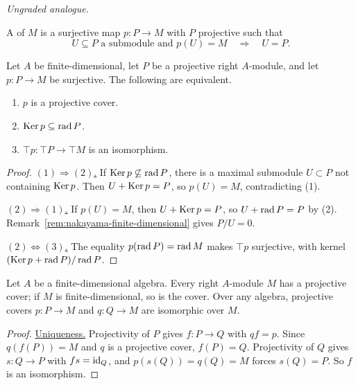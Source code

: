 \begin{advanced}
\emph{Ungraded analogue.}

\begin{definition}\label{def:projective-cover}
A  of $M$ is a surjective map $p:P\to M$ with $P$ projective such that
\[
U\subseteq P\text{ a submodule and }p(U)=M
\quad\Longrightarrow\quad U=P.
\]
\end{definition}

\begin{proposition}\label{prop:cover-top}
Let $A$ be finite-dimensional, let $P$ be a projective right $A$-module, and let $p:P\to M$ be surjective.
The following are equivalent.
\begin{enumerate}
\item $p$ is a projective cover.
\item $\operatorname{Ker}\nolimits p\subseteq \operatorname{rad}\nolimits P$.
\item $\top p:\top P\to\top M$ is an isomorphism.
\end{enumerate}
\end{proposition}

\begin{proof}
\underline{$(1)\Rightarrow(2)$.}
If $\operatorname{Ker}\nolimits p\not\subseteq\operatorname{rad}\nolimits P$, there is a maximal submodule $U\subset P$ not containing $\operatorname{Ker}\nolimits p$.
Then $U+\operatorname{Ker}\nolimits p=P$, so $p(U)=M$, contradicting (1).

\underline{$(2)\Rightarrow(1)$.}
If $p(U)=M$, then $U+\operatorname{Ker}\nolimits p=P$, so $U+\operatorname{rad}\nolimits P=P$ by (2).
Remark~\ref{rem:nakayama-finite-dimensional} gives $P/U=0$.

\underline{$(2)\Leftrightarrow(3)$.}
The equality $p(\operatorname{rad}\nolimits P)=\operatorname{rad}\nolimits M$ makes $\top p$ surjective, with kernel $(\operatorname{Ker}\nolimits p+\operatorname{rad}\nolimits P)/\operatorname{rad}\nolimits P$.
\end{proof}

\begin{theorem}\label{thm:ordinary-projective-covers}
Let $A$ be a finite-dimensional algebra.
Every right $A$-module $M$ has a projective cover; if $M$ is finite-dimensional, so is the cover.
Over any algebra, projective covers $p:P\to M$ and $q:Q\to M$ are isomorphic over $M$.
\end{theorem}

\begin{proof}
\underline{Uniqueness.}
Projectivity of $P$ gives $f:P\to Q$ with $qf=p$.
Since $q(f(P))=M$ and $q$ is a projective cover, $f(P)=Q$.
Projectivity of $Q$ gives $s:Q\to P$ with $fs=\operatorname{id}_Q$, and $p(s(Q))=q(Q)=M$ forces $s(Q)=P$.
So $f$ is an isomorphism.


\end{proof}
\end{advanced}
